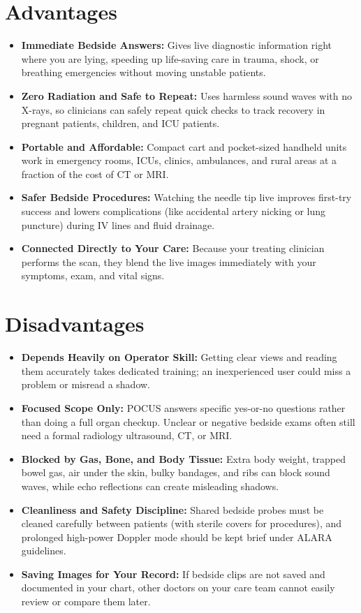\section{Advantages}

\begin{itemize}
    \item \textbf{Immediate Bedside Answers:} Gives live diagnostic information right where you are lying, speeding up life-saving care in trauma, shock, or breathing emergencies without moving unstable patients.
    \item \textbf{Zero Radiation and Safe to Repeat:} Uses harmless sound waves with no X-rays, so clinicians can safely repeat quick checks to track recovery in pregnant patients, children, and ICU patients.
    \item \textbf{Portable and Affordable:} Compact cart and pocket-sized handheld units work in emergency rooms, ICUs, clinics, ambulances, and rural areas at a fraction of the cost of CT or MRI.
    \item \textbf{Safer Bedside Procedures:} Watching the needle tip live improves first-try success and lowers complications (like accidental artery nicking or lung puncture) during IV lines and fluid drainage.
    \item \textbf{Connected Directly to Your Care:} Because your treating clinician performs the scan, they blend the live images immediately with your symptoms, exam, and vital signs.
\end{itemize}

\section{Disadvantages}

\begin{itemize}
    \item \textbf{Depends Heavily on Operator Skill:} Getting clear views and reading them accurately takes dedicated training; an inexperienced user could miss a problem or misread a shadow.
    \item \textbf{Focused Scope Only:} POCUS answers specific yes-or-no questions rather than doing a full organ checkup. Unclear or negative bedside exams often still need a formal radiology ultrasound, CT, or MRI.
    \item \textbf{Blocked by Gas, Bone, and Body Tissue:} Extra body weight, trapped bowel gas, air under the skin, bulky bandages, and ribs can block sound waves, while echo reflections can create misleading shadows.
    \item \textbf{Cleanliness and Safety Discipline:} Shared bedside probes must be cleaned carefully between patients (with sterile covers for procedures), and prolonged high-power Doppler mode should be kept brief under ALARA guidelines.
    \item \textbf{Saving Images for Your Record:} If bedside clips are not saved and documented in your chart, other doctors on your care team cannot easily review or compare them later.
\end{itemize}

